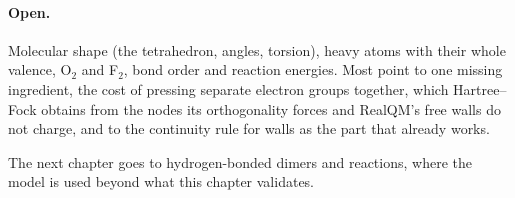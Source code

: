 \paragraph{Open.} Molecular shape (the tetrahedron, angles, torsion), heavy atoms with their whole valence,
O$_2$ and F$_2$, bond order and reaction energies. Most point to one missing ingredient, the cost of pressing
separate electron groups together, which Hartree--Fock obtains from the nodes its orthogonality forces and
RealQM's free walls do not charge, and to the continuity rule for walls as the part that already works.

The next chapter goes to hydrogen-bonded dimers and reactions, where the model is used beyond what this
chapter validates.

